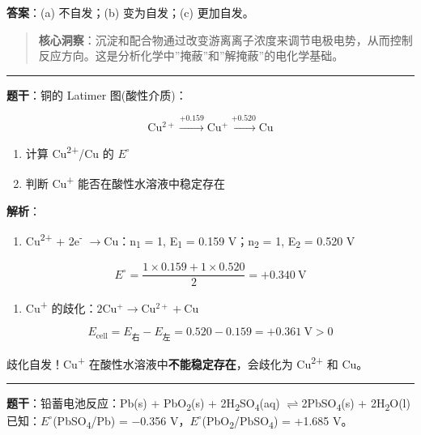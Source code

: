 \documentclass[a4paper,11pt]{ctexart}
\providecommand{\tightlist}{\setlength{\itemsep}{0pt}\setlength{\parskip}{0pt}}
\newcommand{\箭}{\ensuremath{\rightarrow}}
\newcommand{\左箭}{\ensuremath{\leftarrow}}
\newcommand{\上箭}{\ensuremath{\uparrow}}
\newcommand{\下箭}{\ensuremath{\downarrow}}
\newcommand{\衡}{\ensuremath{\rightleftharpoons}}
\newcommand{\双箭}{\ensuremath{\leftrightarrow}}
\newcommand{\约等于}{\ensuremath{\approx}}
\newcommand{\小于等于}{\ensuremath{\leq}}
\newcommand{\大于等于}{\ensuremath{\geq}}
\newcommand{\不等于}{\ensuremath{\neq}}
\newcommand{\西格马}{\ensuremath{\sigma}}
\newcommand{\派}{\ensuremath{\pi}}
\begin{document}
\textbf{答案}：(a) 不自发；(b) 变为自发；(c) 更加自发。

\begin{quote}
\textbf{核心洞察}：沉淀和配合物通过改变游离离子浓度来调节电极电势，从而控制反应方向。这是分析化学中''掩蔽''和''解掩蔽''的电化学基础。
\end{quote}

\begin{center}\rule{0.5\linewidth}{0.5pt}\end{center}

\textbf{题干}：铜的 Latimer 图(酸性介质)：

\[\mathrm{Cu^{2+}} \xrightarrow{+0.159} \mathrm{Cu^+} \xrightarrow{+0.520} \mathrm{Cu}\]

\begin{enumerate}
\def\labelenumi{(\alph{enumi})}
\tightlist
\item
  计算 Cu\textsuperscript{2+}/Cu 的 \(E^{\circ}\)
\item
  判断 Cu\textsuperscript{+} 能否在酸性水溶液中稳定存在
\end{enumerate}

\textbf{解析}：

\begin{enumerate}
\def\labelenumi{(\alph{enumi})}
\tightlist
\item
  Cu\textsuperscript{2+} + 2e\textsuperscript{-} \箭 Cu：n\textsubscript{1} = 1, E\textsubscript{1} = 0.159 V；n\textsubscript{2} = 1, E\textsubscript{2} = 0.520 V
\end{enumerate}

\[E^\circ = \frac{1 \times 0.159 + 1 \times 0.520}{2} = +0.340\ \mathrm{V}\]

\begin{enumerate}
\def\labelenumi{(\alph{enumi})}
\setcounter{enumi}{1}
\tightlist
\item
  Cu\textsuperscript{+} 的歧化：\(2\mathrm{Cu^+ \to Cu^{2+} + Cu}\)
\end{enumerate}

\[E_{\text{cell}} = E_{\text{右}} - E_{\text{左}} = 0.520 - 0.159 = +0.361\ \mathrm{V} > 0\]

歧化自发！Cu\textsuperscript{+} 在酸性水溶液中\textbf{不能稳定存在}，会歧化为 Cu\textsuperscript{2+} 和 Cu。

\begin{center}\rule{0.5\linewidth}{0.5pt}\end{center}

\textbf{题干}：铅蓄电池反应：Pb(s) + PbO\textsubscript{2}(s) + 2H\textsubscript{2}SO\textsubscript{4}(aq) \衡 2PbSO\textsubscript{4}(s) + 2H\textsubscript{2}O(l)
已知：\(E^{\circ}\)(PbSO\textsubscript{4}/Pb) = −0.356 V，\(E^{\circ}\)(PbO\textsubscript{2}/PbSO\textsubscript{4}) = +1.685 V。
\end{document}
